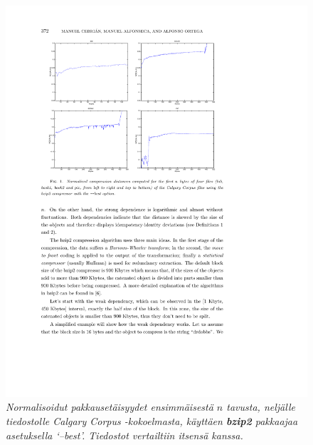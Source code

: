 \documentclass[12pt,finnish]{tktltiki2}
\theoremstyle{definition}
\theoremstyle{remark}
\begin{document}
    \begin{figure}[!htb]
      \includegraphics[width=\textwidth]{img/bzip2-best}
      \caption{\emph{Normalisoidut pakkausetäisyydet ensimmäisestä $n$ tavusta, neljälle tiedostolle Calgary Corpus -kokoelmasta, käyttäen \textbf{bzip2} pakkaajaa asetuksella `--best'. Tiedostot vertailtiin itsensä kanssa.} \cite{cebrian2005common}}
      \label{fig:bzip2-best}
    \end{figure}
\end{document}
